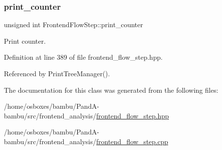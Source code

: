 \subsubsection{\texorpdfstring{print\+\_\+counter}{print\_counter}}
{\footnotesize\ttfamily unsigned int Frontend\+Flow\+Step\+::print\+\_\+counter\hspace{0.3cm}{\ttfamily [protected]}}



Print counter. 



Definition at line 389 of file frontend\+\_\+flow\+\_\+step.\+hpp.



Referenced by Print\+Tree\+Manager().



The documentation for this class was generated from the following files\+:\begin{DoxyCompactItemize}
\item 
/home/osboxes/bambu/\+Pand\+A-\/bambu/src/frontend\+\_\+analysis/\hyperlink{frontend__flow__step_8hpp}{frontend\+\_\+flow\+\_\+step.\+hpp}\item 
/home/osboxes/bambu/\+Pand\+A-\/bambu/src/frontend\+\_\+analysis/\hyperlink{frontend__flow__step_8cpp}{frontend\+\_\+flow\+\_\+step.\+cpp}\end{DoxyCompactItemize}
